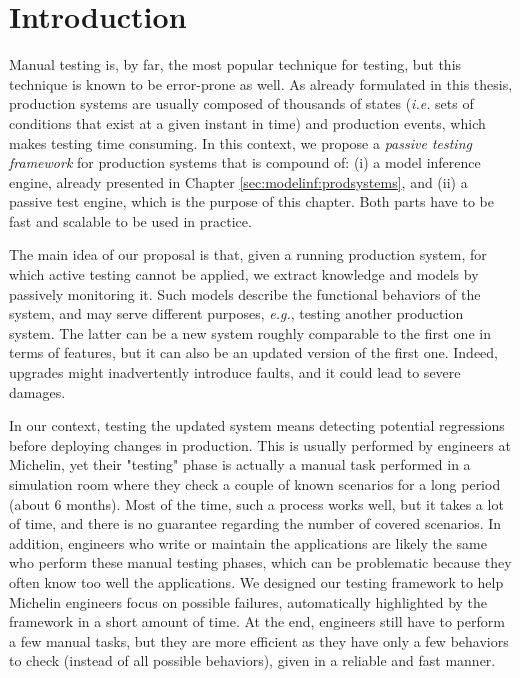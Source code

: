 \section{Introduction}
\label{sec:testing:intro}

Manual testing is, by far, the most popular technique for
testing, but this technique is known to be error-prone as well.
As already formulated in this thesis, production systems are
usually composed of thousands of states (\emph{i.e.} sets of
conditions that exist at a given instant in time) and production
events, which makes testing time consuming.  In this context, we
propose a \emph{passive testing framework} for production systems
that is compound of: (i) a model inference engine, already
presented in Chapter \ref{sec:modelinf:prodsystems}, and (ii) a
passive test engine, which is the purpose of this chapter. Both
parts have to be fast and scalable to be used in practice.

The main idea of our proposal is that, given a running production
system, for which active testing cannot be applied, we extract
knowledge and models by passively monitoring it. Such models
describe the functional behaviors of the system, and may serve
different purposes, \emph{e.g.}, testing another production
system. The latter can be a new system roughly comparable to the
first one in terms of features, but it can also be an updated
version of the first one. Indeed, upgrades might inadvertently
introduce faults, and it could lead to severe damages.

In our context, testing the updated system means detecting potential
regressions before deploying changes in production. This is
usually performed by engineers at Michelin, yet their "testing"
phase is actually a manual task performed in a simulation room
where they check a couple of known scenarios for a long period
(about 6 months). Most of the time, such a process works well,
but it takes a lot of time, and there is no guarantee regarding
the number of covered scenarios. In addition, engineers who write
or maintain the applications are likely the same who perform
these manual testing phases, which can be problematic because
they often know too well the applications. We designed our
testing framework to help Michelin engineers focus on possible
failures, automatically highlighted by the framework in a short
amount of time. At the end, engineers still have to perform a few
manual tasks, but they are more efficient as they have only a few
behaviors to check (instead of all possible behaviors), given in
a reliable and fast manner.

